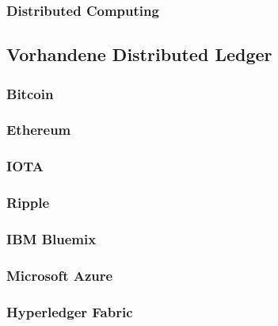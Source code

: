 \subsubsection{Distributed Computing}


\subsection{Vorhandene Distributed Ledger}


\subsubsection{Bitcoin}


\subsubsection{Ethereum}


\subsubsection{IOTA}


\subsubsection{Ripple}


\subsubsection{IBM Bluemix}


\subsubsection{Microsoft Azure}


\subsubsection{Hyperledger Fabric}


\newpage